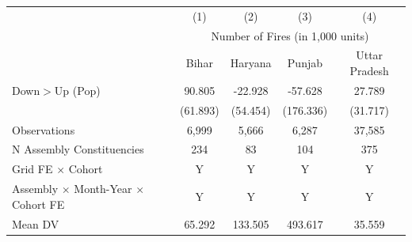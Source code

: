 \begin{tabular}{lcccc} \hline
 & (1) & (2) & (3) & (4) \\
 & \multicolumn{4}{c}{Number of Fires (in 1,000 units)}\\
 & Bihar & Haryana & Punjab & Uttar Pradesh \\ \hline

Down$>$Up (Pop)&      90.805         &     -22.928         &     -57.628         &      27.789         \\
            &    (61.893)         &    (54.454)         &   (176.336)         &    (31.717)         \\
\hline
Observations&       6,999         &       5,666         &       6,287         &      37,585         \\
N Assembly Constituencies&         234         &          83         &         104         &         375         \\
Grid FE  $\times$ Cohort&           Y         &           Y         &           Y         &           Y         \\
Assembly $\times$ Month-Year $\times$ Cohort FE&           Y         &           Y         &           Y         &           Y         \\
Mean DV     &      65.292         &     133.505         &     493.617         &      35.559         \\
\hline
\end{tabular}
